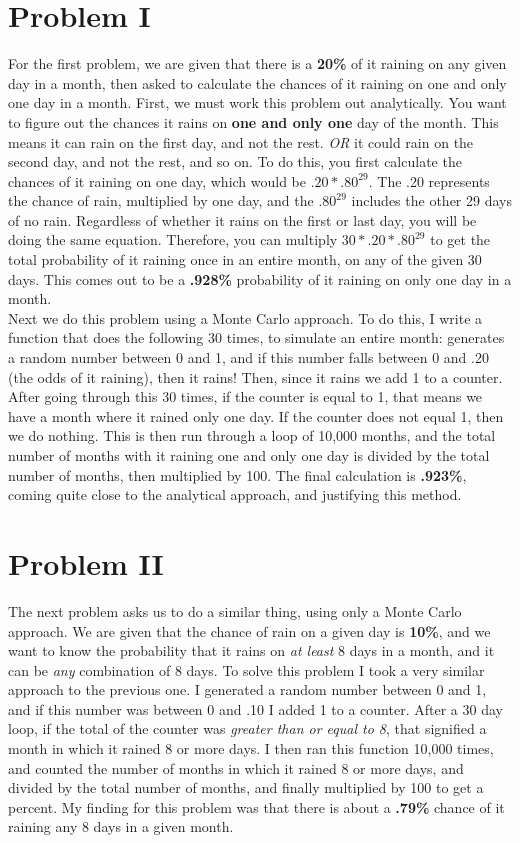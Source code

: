 \documentclass[twocolumn]{revtex4}
\begin{document}
\section{Problem I}
For the first problem, we are given that there is a {\bf20\%} of it raining on any given day in a month, then asked to calculate the chances of it raining on one and only one day in a month. First, we must work this problem out analytically. You want to figure out the chances it rains on {\bf one and only one} day of the month. This means it can rain on the first day, and not the rest. {\it OR} it could rain on the second day, and not the rest, and so on. To do this, you first calculate the chances of it raining on one day, which would be \underline{$.20 * .80^{29}$}. The .20 represents the chance of rain, multiplied by one day, and the {$.80^{29}$} includes the other 29 days of no rain. Regardless of whether it rains on the first or last day, you will be doing the same equation. Therefore, you can multiply \underline{$30 * .20 * .80^{29}$} to get the total probability of it raining once in an entire month, on any of the given 30 days. This comes out to be a {\bf.928\%} probability of it raining on only one day in a month.\\
    Next we do this problem using a Monte Carlo approach. To do this, I write a function that does the following 30 times, to simulate an entire month: generates a random number between 0 and 1, and if this number falls between 0 and .20 (the odds of it raining), then it rains! Then, since it rains we add 1 to a counter. After going through this 30 times, if the counter is equal to 1, that means we have a month where it rained only one day. If the counter does not equal 1, then we do nothing. This is then run through a loop of 10,000 months, and the total number of months with it raining one and only one day is divided by the total number of months, then multiplied by 100. The final calculation is {\bf.923\%}, coming quite close to the analytical approach, and justifying this method. 

\section{Problem II}
The next problem asks us to do a similar thing, using only a Monte Carlo approach. We are given that the chance of rain on a given day is {\bf10\%}, and we want to know the probability that it rains on {\it at least} 8 days in a month, and it can be {\it any} combination of 8 days. To solve this problem I took a very similar approach to the previous one. I generated a random number between 0 and 1, and if this number was between 0 and .10 I added 1 to a counter. After a 30 day loop, if the total of the counter was {\it greater than or equal to 8}, that signified a month in which it rained 8 or more days. I then ran this function 10,000 times, and counted the number of months in which it rained 8 or more days, and divided by the total number of months, and finally multiplied by 100 to get a percent. My finding for this problem was that there is about a {\bf.79\%} chance of it raining any 8 days in a given month. 
\end{document}
